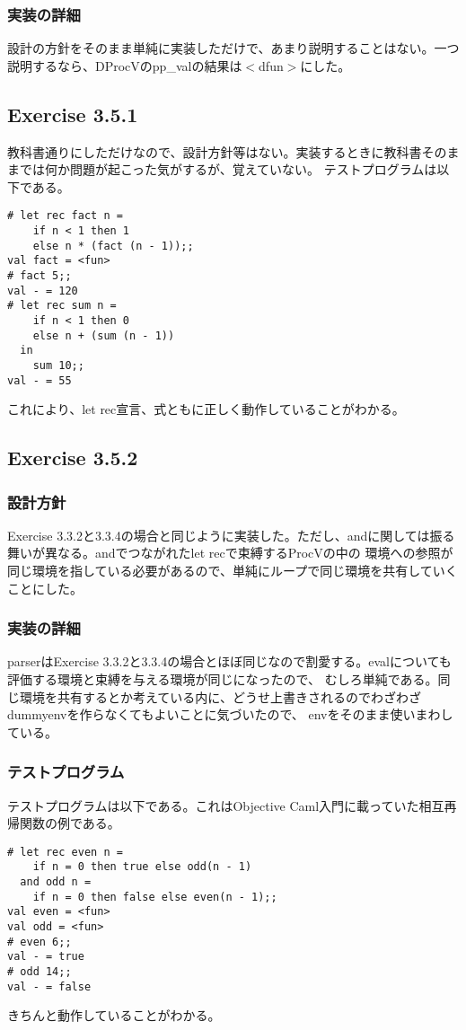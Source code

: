 \documentclass{jarticle}
\begin{document}
\subsubsection{実装の詳細}
設計の方針をそのまま単純に実装しただけで、あまり説明することはない。一つ説明するなら、DProcVのpp\_valの結果は$<$dfun$>$にした。

\subsection{Exercise 3.5.1}
教科書通りにしただけなので、設計方針等はない。実装するときに教科書そのままでは何か問題が起こった気がするが、覚えていない。
テストプログラムは以下である。
\begin{lstlisting}[basicstyle=\ttfamily\footnotesize, frame=single]
# let rec fact n =
    if n < 1 then 1
    else n * (fact (n - 1));;
val fact = <fun>
# fact 5;;
val - = 120
# let rec sum n =
    if n < 1 then 0
    else n + (sum (n - 1))
  in
    sum 10;;
val - = 55
\end{lstlisting}
これにより、let rec宣言、式ともに正しく動作していることがわかる。

\subsection{Exercise 3.5.2}
\subsubsection{設計方針}
Exercise 3.3.2と3.3.4の場合と同じように実装した。ただし、andに関しては振る舞いが異なる。andでつながれたlet recで束縛するProcVの中の
環境への参照が同じ環境を指している必要があるので、単純にループで同じ環境を共有していくことにした。
\subsubsection{実装の詳細}
parserはExercise 3.3.2と3.3.4の場合とほぼ同じなので割愛する。evalについても評価する環境と束縛を与える環境が同じになったので、
むしろ単純である。同じ環境を共有するとか考えている内に、どうせ上書きされるのでわざわざdummyenvを作らなくてもよいことに気づいたので、
envをそのまま使いまわしている。
\subsubsection{テストプログラム}
テストプログラムは以下である。これはObjective Caml入門に載っていた相互再帰関数の例である。
\begin{lstlisting}[basicstyle=\ttfamily\footnotesize, frame=single]
# let rec even n =
    if n = 0 then true else odd(n - 1)
  and odd n =
    if n = 0 then false else even(n - 1);;
val even = <fun>
val odd = <fun>
# even 6;;
val - = true
# odd 14;;
val - = false
\end{lstlisting}
きちんと動作していることがわかる。
\end{document}
